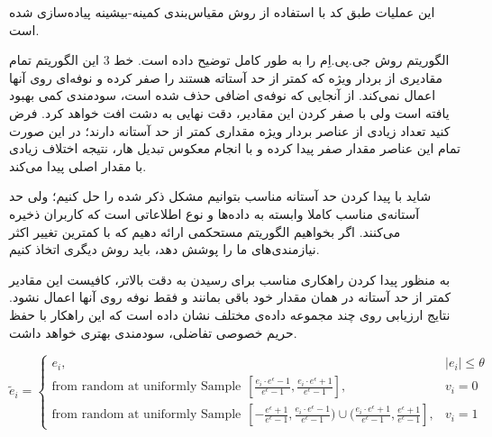 این عملیات طبق کد  با استفاده از روش مقیاس‌بندی کمینه-بیشینه پیاده‌سازی شده است.



الگوریتم  روش جی.پی.اِم را به طور کامل توضیح داده است. خط 3 این الگوریتم تمام مقادیری از بردار ویژه که کمتر از حد آستاته هستند را صفر کرده و نوفه‌ای روی آنها اعمال نمی‌کند. از آنجایی که نوفه‌ی اضافی حذف شده است، سودمندی کمی بهبود یافته است ولی با صفر کردن این مقادیر، دقت نهایی به دشت افت خواهد کرد. فرض کنید تعداد زیادی از عناصر بردار ویژه مقداری کمتر از حد آستانه دارند؛ در این صورت تمام این عناصر مقدار صفر پیدا کرده و با انجام معکوس تبدیل هار، نتیجه اختلاف زیادی با مقدار اصلی پیدا می‌کند.

شاید با پیدا کردن حد آستانه مناسب بتوانیم مشکل ذکر شده را حل کنیم؛ ولی حد آستانه‌ی مناسب کاملا وابسته به داده‌ها و نوع اطلاعاتی است که کاربران ذخیره می‌کنند. اگر بخواهیم الگوریتم مستحکمی ارائه دهیم که با کمترین تغییر اکثر نیازمندی‌های ما را پوشش دهد، باید روش دیگری اتخاذ کنیم.

به منظور پیدا کردن راهکاری مناسب برای رسیدن به دقت بالاتر، کافیست این مقادیر کمتر از حد آستانه در همان مقدار خود باقی بمانند و فقط نوفه روی آنها اعمال نشود. نتایج ارزیابی روی چند مجموعه داده‌ی مختلف نشان داده است که این راهکار با حفظ حریم خصوصی تفاضلی، سودمندی بهتری خواهد داشت.

$$\tilde{e}_i = 
\begin{cases} 
e_i, & |e_i| \leq \theta \\
\text{from random at uniformly Sample} \hspace{5pt} [\frac{e_i \cdot e^{\epsilon}-1}{e^{\epsilon}-1}, \frac{e_i \cdot e^{\epsilon}+1}{e^{\epsilon}-1}], & v_i = 0 \\
\text{from random at uniformly Sample} \hspace{5pt} [-\frac{e^{\epsilon}+1}{e^{\epsilon}-1}, \frac{e_i \cdot e^{\epsilon}-1}{e^{\epsilon}-1}) \cup (\frac{e_i \cdot e^{\epsilon}+1}{e^{\epsilon}-1}, \frac{e^{\epsilon}+1}{e^{\epsilon}-1}], & v_i = 1 
\end{cases}$$




